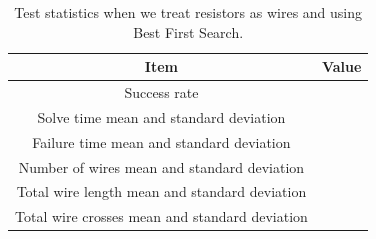 \begin{table}[H]
\begin{center}
\begin{singlespace}
\begin{tabular}{| c | c |}
\hline
Item & Value \\
\hline\hline
Success rate & \\
Solve time mean and standard deviation & \\
Failure time mean and standard deviation & \\
Number of wires mean and standard deviation & \\
Total wire length mean and standard deviation & \\
Total wire crosses mean and standard deviation & \\
\hline
\end{tabular}
\end{singlespace}
\end{center}
\label{tb:as_wire_best_first}
\caption{Test statistics when we treat resistors as wires and \q using Best
First Search.}
\end{table}
